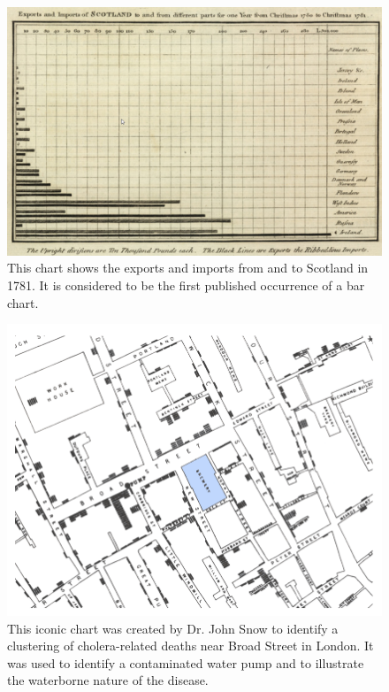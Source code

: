 \begin{figure}[tp]
    \centering
    \includegraphics[keepaspectratio,width=\linewidth,height=\fullh / 3]
    {images/playfair-bar-chart.png}
    \caption[Chart of 1781 Exports and Imports of Scotland From 1786]{
        This chart shows the exports and imports from and to Scotland in 1781. It is considered to be the first published occurrence of a bar chart. 
    }
    \label{fig:PlayfairBarChart}
\end{figure}

\begin{figure}[tp]
    \centering
    \includegraphics[keepaspectratio,width=\linewidth,height=\fullh / 3]
    {images/cholera-dot-map.png}
    \caption[Dot Map Plotting Cholera Deaths in London From 1855]{
        This iconic chart was created by Dr. John Snow to identify a clustering of cholera-related deaths near Broad Street in London. It was used to identify a contaminated water pump and to illustrate the waterborne nature of the disease. 
    }
    \label{fig:CholeraDotMap}
\end{figure}

